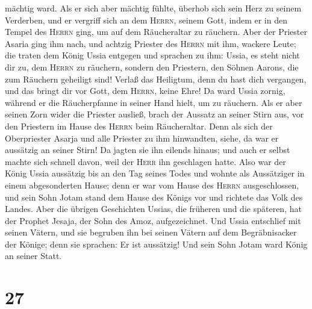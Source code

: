 mächtig ward.  Als er sich aber mächtig fühlte, überhob
sich sein Herz zu seinem Verderben, und er vergriff sich an dem
\textsc{Herrn}, seinem Gott, indem er in den Tempel des \textsc{Herrn}
ging, um auf dem Räucheraltar zu räuchern.  Aber der
Priester Asaria ging ihm nach, und achtzig Priester des \textsc{Herrn}
mit ihm, wackere Leute;  die traten dem König Ussia
entgegen und sprachen zu ihm: Ussia, es steht nicht dir zu, dem
\textsc{Herrn} zu räuchern, sondern den Priestern, den Söhnen Aarons,
die zum Räuchern geheiligt sind! Verlaß das Heiligtum, denn du hast dich
vergangen, und das bringt dir vor Gott, dem \textsc{Herrn}, keine Ehre!
 Da ward Ussia zornig, während er die Räucherpfanne in
seiner Hand hielt, um zu räuchern. Als er aber seinen Zorn wider die
Priester ausließ, brach der Aussatz an seiner Stirn aus, vor den
Priestern im Hause des \textsc{Herrn} beim Räucheraltar. 
Denn als sich der Oberpriester Asarja und alle Priester zu ihm
hinwandten, siehe, da war er aussätzig an seiner Stirn! Da jagten sie
ihn eilends hinaus; und auch er selbst machte sich schnell davon, weil
der \textsc{Herr} ihn geschlagen hatte.  Also war der
König Ussia aussätzig bis an den Tag seines Todes und wohnte als
Aussätziger in einem abgesonderten Hause; denn er war vom Hause des
\textsc{Herrn} ausgeschlossen, und sein Sohn Jotam stand dem Hause des
Königs vor und richtete das Volk des Landes.  Aber die
übrigen Geschichten Ussias, die früheren und die späteren, hat der
Prophet Jesaja, der Sohn des Amoz, aufgezeichnet.  Und
Ussia entschlief mit seinen Vätern, und sie begruben ihn bei seinen
Vätern auf dem Begräbnisacker der Könige; denn sie sprachen: Er ist
aussätzig! Und sein Sohn Jotam ward König an seiner Statt.

\hypertarget{section-26}{%
\section{27}\label{section-26}}

